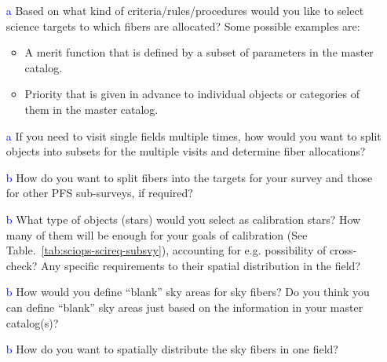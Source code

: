 \documentclass[a4paper,notitlepage]{article}
\newcommand{\coll}[1]{\textcolor{blue}{#1}}
\begin{document}
\begin{enumerate}
  \item[\coll{a}] Based on what kind of criteria/rules/procedures would
           you like to select science targets to which fibers are
           allocated? Some possible examples are:
           \begin{itemize}
        \item A merit function that is defined by a subset of
              parameters in the master catalog.
        \item Priority that is given in advance to individual
              objects or categories of them in the master
              catalog.
           \end{itemize}
  \item[\coll{a}] If you need to visit single fields multiple times, how
           would you want to split objects into subsets for the
           multiple visits and determine fiber allocations?
  \item[\coll{b}] How do you want to split fibers into the targets for
           your survey and those for other PFS sub-surveys, if
           required?
  \item[\coll{b}] What type of objects (stars) would you select as
           calibration stars? How many of them will be enough for
           your goals of calibration (See
           Table.~\ref{tab:sciops-scireq-subsvy}), accounting for
           e.g. possibility of cross-check? Any specific
           requirements to their spatial distribution in the field?
  \item[\coll{b}] How would you define ``blank'' sky areas for sky
           fibers? Do you think you can define ``blank'' sky areas
           just based on the information in your master catalog(s)?
  \item[\coll{b}] How do you want to spatially distribute the sky fibers
           in one field?
\end{enumerate}
\end{document}
